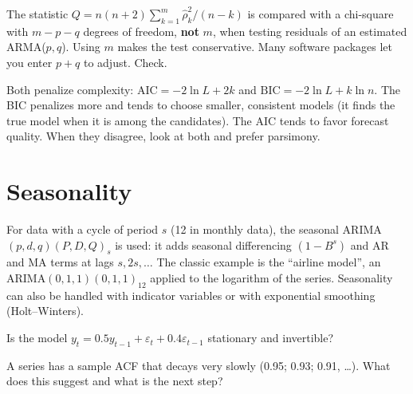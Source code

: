 \begin{atencao}
The statistic $Q=n(n+2)\sum_{k=1}^m\hat\rho_k^2/(n-k)$ is compared with a chi-square with $m-p-q$ degrees of freedom, \textbf{not} $m$, when testing residuals of an estimated ARMA($p,q$). Using $m$ makes the test conservative. Many software packages let you enter $p+q$ to adjust. Check.
\end{atencao}

\begin{intuicao}
Both penalize complexity: $\text{AIC}=-2\ln L+2k$ and $\text{BIC}=-2\ln L+k\ln n$. The BIC penalizes more and tends to choose smaller, consistent models (it finds the true model when it is among the candidates). The AIC tends to favor forecast quality. When they disagree, look at both and prefer parsimony.
\end{intuicao}

\section{Seasonality}
For data with a cycle of period $s$ (12 in monthly data), the seasonal ARIMA $(p,d,q)(P,D,Q)_s$ is used: it adds seasonal differencing $(1-B^s)$ and AR and MA terms at lags $s,2s,\dots$ The classic example is the ``airline model'', an ARIMA$(0,1,1)(0,1,1)_{12}$ applied to the logarithm of the series. Seasonality can also be handled with indicator variables or with exponential smoothing (Holt--Winters).

\begin{exercicio}
Is the model $y_t=0.5y_{t-1}+\varepsilon_t+0.4\varepsilon_{t-1}$ stationary and invertible?
\end{exercicio}

\begin{exercicio}
A series has a sample ACF that decays very slowly (0.95; 0.93; 0.91, \dots). What does this suggest and what is the next step?
\end{exercicio}
